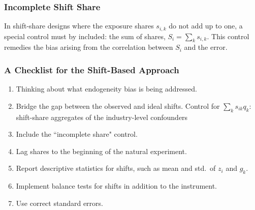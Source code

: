 \subsubsection{Incomplete Shift Share}
\label{sec:ssiv_incomplete_share}
In shift-share designs where the exposure shares $s_{i,k}$ do not add up to one,
a special control must by included: the sum of shares, $S_i = \sum_{k} s_{i,k}$.
This control remedies the bias arising from the correlation between $S_i$ and the error.

\subsubsection{A Checklist for the Shift-Based Approach}
\begin{enumerate}
    \item Thinking about what endogeneity bias is being addressed.
    \item Bridge the gap between the observed and ideal shifts. 
    Control for $\sum_{k} s_{ik} q_k$: shift-share aggregates of the industry-level confounders
    \item Include the ``incomplete share" control.
    \item Lag shares to the beginning of the natural experiment.
    \item Report descriptive statistics for shifts, such as mean and std.~of $z_i$ and $g_k$.
    \item Implement balance tests for shifts in addition to the instrument.
    \item Use correct standard errors.
\end{enumerate}
